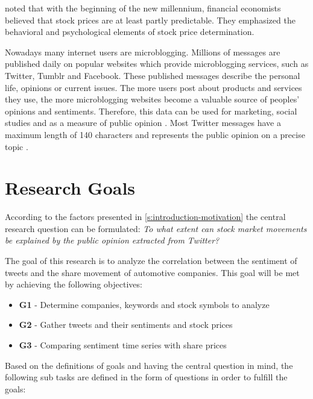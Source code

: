 \citet{Malkiel2003} noted that with the beginning of the new millennium, financial economists believed that stock prices are at least partly predictable.
They emphasized the behavioral and psychological elements of stock price determination.

Nowadays many internet users are microblogging.
Millions of messages are published daily on popular websites which provide microblogging services, such as Twitter, Tumblr and Facebook.
These published messages describe the personal life, opinions or current issues.
The more users post about products and services they use, the more microblogging websites become a valuable source of peoples' opinions and sentiments.
Therefore, this data can be used for marketing, social studies and as a measure of public opinion
\citep{Patodkar2016a, Pagolu2016a}. 
Most Twitter messages have a maximum length of 140 characters and represents the public opinion on a precise topic
\citep{Pagolu2016a}.


\section{Research Goals}
\label{s:introduction-researchgoals}

According to the factors presented in \cref{s:introduction-motivation} the central research question can be formulated:
\emph{To what extent can stock market movements be explained by the public opinion extracted from Twitter?}

The goal of this research is to analyze the correlation between the sentiment of tweets and the share movement of automotive companies.
This goal will be met by achieving the following objectives:

\begin{itemize}
    \item \textbf{G1} - Determine companies, keywords and stock symbols to analyze
    \item \textbf{G2} - Gather tweets and their sentiments and stock prices
    \item \textbf{G3} - Comparing sentiment time series with share prices
\end{itemize}

Based on the definitions of goals and having the central question in mind, the following sub tasks are defined in the form of questions in order to fulfill the goals:

